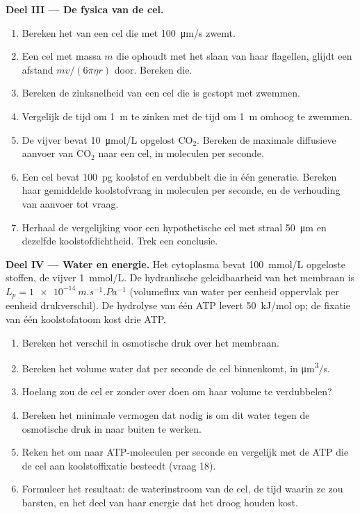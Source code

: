 \begin{problem}
\medskip
\noindent\textbf{Deel III --- De fysica van de cel.}
\begin{enumerate}[resume]
  \item Bereken het  van een cel die met
        \qty{100}{\micro m/s} zwemt.
  \item Een cel met massa $m$ die ophoudt met het slaan van haar
        flagellen, glijdt een afstand $mv/(6\pi\eta r)$ door. Bereken die.
  \item Bereken de zinksnelheid van een cel die is gestopt met
        zwemmen.
  \item Vergelijk de tijd om \qty{1}{m} te zinken met de tijd om
        \qty{1}{m} omhoog te zwemmen.
  \item De vijver bevat \qty{10}{\micro mol/L} opgelost
        $\mathrm{CO_2}$. Bereken de maximale diffusieve aanvoer van
        $\mathrm{CO_2}$ naar een cel, in moleculen per seconde.
  \item Een cel bevat \qty{100}{pg} koolstof en verdubbelt die in
        één generatie. Bereken haar gemiddelde koolstofvraag in moleculen
        per seconde, en de verhouding van aanvoer tot vraag.
  \item Herhaal de vergelijking voor een hypothetische cel met straal
        \qty{50}{\micro m} en dezelfde koolstofdichtheid. Trek een conclusie.
\end{enumerate}

\medskip
\noindent\textbf{Deel IV --- Water en energie.}
Het cytoplasma bevat \qty{100}{mmol/L} opgeloste stoffen, de vijver
\qty{1}{mmol/L}. De hydraulische geleidbaarheid van het membraan is $L_p =
\qty{1e-14}{m.s^{-1}.Pa^{-1}}$ (volumeflux van water per eenheid
oppervlak per eenheid drukverschil). De hydrolyse van één ATP levert
\qty{50}{kJ/mol} op; de fixatie van één koolstofatoom kost drie ATP.
\begin{enumerate}[resume]
  \item Bereken het verschil in osmotische druk over het membraan.
  \item Bereken het volume water dat per seconde de cel binnenkomt, in
        \unit{\micro m^3/s}.
  \item Hoelang zou de cel er zonder  over doen om
        haar volume te verdubbelen?
  \item Bereken het minimale vermogen dat nodig is om dit water tegen
        de osmotische druk in naar buiten te werken.
  \item Reken het om naar ATP-moleculen per seconde en vergelijk met de
        ATP die de cel aan koolstoffixatie besteedt (vraag 18).
  \item Formuleer het resultaat: de waterinstroom van de cel, de tijd
        waarin ze zou barsten, en het deel van haar energie dat het
        droog houden kost.
\end{enumerate}
\end{problem}
